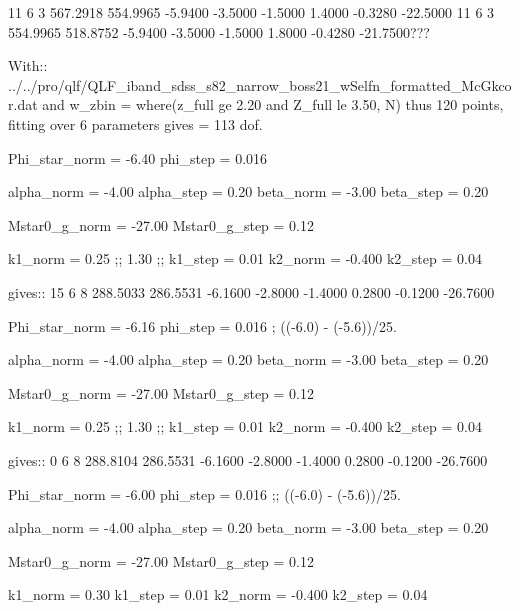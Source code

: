 


      11       6       3       567.2918       554.9965  -5.9400  -3.5000  -1.5000   1.4000  -0.3280 -22.5000
      11       6       3       554.9965       518.8752  -5.9400  -3.5000  -1.5000   1.8000  -0.4280 -21.7500???




With:: 
    ../../pro/qlf/QLF_iband_sdss_s82_narrow_boss21_wSelfn_formatted_McGkcor.dat
and 
    w_zbin = where(z_full ge 2.20 and Z_full le 3.50, N)
thus 120 points, fitting over 6 parameters gives = 113 dof. 


   Phi_star_norm = -6.40
   phi_step      =  0.016  

   alpha_norm    = -4.00
   alpha_step    =  0.20    
   beta_norm     = -3.00
   beta_step     =  0.20    
   
   Mstar0_g_norm = -27.00    
   Mstar0_g_step =   0.12

   k1_norm       = 0.25     ;; 1.30      ;; 
   k1_step       = 0.01
   k2_norm       = -0.400
   k2_step       = 0.04

gives::
      15       6       8       288.5033       286.5531  -6.1600  -2.8000  -1.4000   0.2800  -0.1200 -26.7600


   Phi_star_norm = -6.16
   phi_step      =  0.016  ; ((-6.0) - (-5.6))/25.

   alpha_norm    = -4.00
   alpha_step    =  0.20     
   beta_norm     = -3.00
   beta_step     =  0.20     
   
   Mstar0_g_norm = -27.00    
   Mstar0_g_step =   0.12

   k1_norm       = 0.25     ;; 1.30      ;; 
   k1_step       = 0.01
   k2_norm       = -0.400
   k2_step       = 0.04

gives::
       0       6       8       288.8104       286.5531  -6.1600  -2.8000  -1.4000   0.2800  -0.1200 -26.7600



   Phi_star_norm = -6.00
   phi_step          =   0.016    ;; ((-6.0) - (-5.6))/25.

   alpha_norm    = -4.00
   alpha_step    =  0.20     
   beta_norm     = -3.00
   beta_step     =  0.20     
   
   Mstar0_g_norm = -27.00    
   Mstar0_g_step =   0.12

   k1_norm       = 0.30    
   k1_step       = 0.01
   k2_norm       = -0.400
   k2_step       = 0.04

